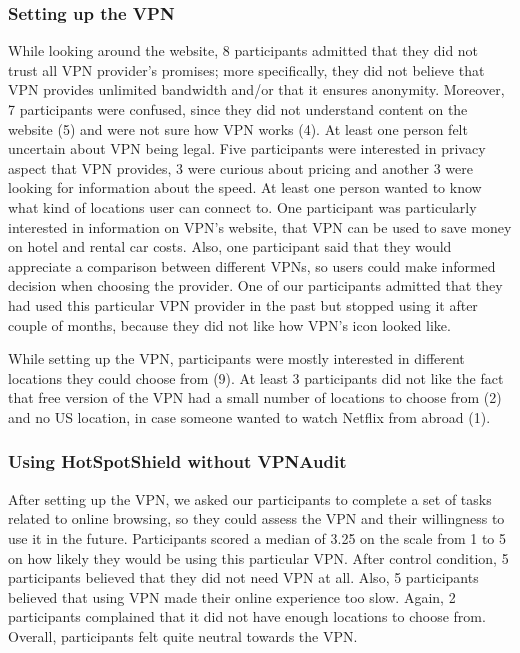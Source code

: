 \subsubsection{Setting up the VPN}

While looking around the website, 8 participants admitted that they did not
trust all VPN provider's promises; more specifically, they did not believe
that VPN provides unlimited bandwidth and/or that it ensures anonymity.
Moreover, 7 participants were confused, since they did not understand content
on the website (5) and were not sure how VPN works (4). At least one person
felt uncertain about VPN being legal. Five participants were interested in
privacy aspect that VPN provides, 3 were curious about pricing and another 3
were looking for information about the speed. At least one person wanted to
know what kind of locations user can connect to. One participant was
particularly interested in information on VPN's website, that VPN can be used
to save money on hotel and rental car costs.  Also, one participant said that
they would appreciate a comparison between different VPNs, so users could make
informed decision when choosing the provider. One of our participants admitted
that they had used this particular VPN provider in the past but stopped using
it after couple of months, because they did not like how VPN's icon looked
like. 

While setting up the VPN, participants were mostly interested in different
locations they could choose from (9). At least 3 participants did not like the
fact that free version of the VPN had a small number of locations to choose
from (2) and no US location, in case someone wanted to watch Netflix from
abroad (1).


\subsubsection{Using HotSpotShield without VPNAudit}

After setting up the VPN, we asked our participants to complete a set of tasks
related to online browsing, so they could assess the VPN and their willingness
to use it in the future. Participants scored a median of 3.25 on the scale
from 1 to 5 on how likely they would be using this particular VPN. After
control condition, 5 participants believed that they did not need VPN at all.
Also, 5 participants believed that using VPN made their online experience too
slow. Again, 2 participants complained that it did not have enough locations
to choose from. Overall, participants felt quite neutral towards the VPN.


